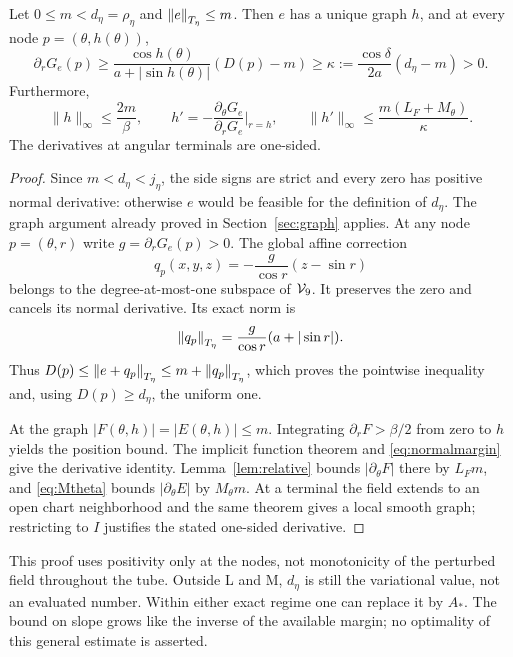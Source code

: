 \documentclass[11pt,a4paper]{article}
\begin{document}
\begin{proposition}\label{prop:margin}
Let $0\le m<d_\eta=\rho_\eta$ and $\left\lVert e\right\rVert_{T_\eta}\le m$.
Then $e$ has a unique graph $h$, and at every node
$p=(\theta,h(\theta))$,
\begin{equation}\label{eq:normalmargin}
 \partial_rG_e(p)\ge
 \frac{\cos h(\theta)}{a+|\sin h(\theta)|}(D(p)-m)
 \ge\kappa:=\frac{\cos\delta}{2a}(d_\eta-m)>0.
\end{equation}
Furthermore,
\begin{equation}\label{eq:graphbounds}
 \|h\|_\infty\le\frac{2m}{\beta},\qquad
 h'=-\frac{\partial_\theta G_e}{\partial_rG_e}\bigg|_{r=h},
 \qquad
 \|h'\|_\infty\le\frac{m(L_F+M_\theta)}{\kappa}.
\end{equation}
The derivatives at angular terminals are one-sided.
\end{proposition}
\begin{proof}
Since $m<d_\eta<j_\eta$, the side signs are strict and every zero
has positive normal derivative: otherwise $e$ would be feasible for
the definition of $d_\eta$. The graph argument already proved in
Section~\ref{sec:graph} applies. At any node $p=(\theta,r)$ write
$g=\partial_rG_e(p)>0$. The global affine correction
\[
 q_p(x,y,z)=-\frac{g}{\cos r}(z-\sin r)
\]
belongs to the degree-at-most-one subspace of $\mathcal V_9$. It preserves the
zero and cancels its normal derivative. Its exact norm is
\[
 \left\lVert q_p\right\rVert_{T_\eta}=\frac{g}{\cos r}(a+|\sin r|).
\]
Thus $D(p)\le\left\lVert e+q_p\right\rVert_{T_\eta}\le m+\left\lVert q_p\right\rVert_{T_\eta}$, which proves
the pointwise inequality and, using $D(p)\ge d_\eta$, the uniform one.

At the graph $|F(\theta,h)|=|E(\theta,h)|\le m$.
Integrating $\partial_rF>\beta/2$ from zero to $h$ yields the position
bound. The implicit function theorem and \eqref{eq:normalmargin}
give the derivative identity. Lemma~\ref{lem:relative} bounds
$|\partial_\theta F|$ there by $L_Fm$, and \eqref{eq:Mtheta}
bounds $|\partial_\theta E|$ by $M_\theta m$.
At a terminal the field extends to an open chart neighborhood and
the same theorem gives a local smooth graph; restricting to $I$
justifies the stated one-sided derivative.
\end{proof}

This proof uses positivity only at the nodes, not monotonicity of
the perturbed field throughout the tube. Outside L and M, $d_\eta$
is still the variational value, not an evaluated number. Within either
exact regime one can replace it by $A_*$. The bound on slope grows
like the inverse of the available margin; no optimality of this
general estimate is asserted.
\end{document}
